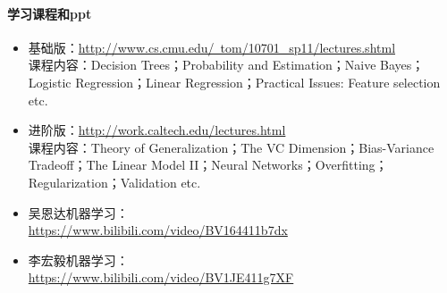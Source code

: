 \documentclass[lang=cn,11pt,a4paper]{eleganttemplate}
\begin{document}
\paragraph{学习课程和ppt}
\begin{itemize}
    \item 基础版：\href{http://www.cs.cmu.edu/~tom/10701_sp11/lectures.shtml}{http://www.cs.cmu.edu/~tom/10701\_sp11/lectures.shtml} \\
课程内容：Decision Trees；Probability and Estimation；Naive Bayes；Logistic Regression；Linear Regression；Practical Issues: Feature selection etc.
    \item 进阶版：\href{http://work.caltech.edu/lectures.html}{http://work.caltech.edu/lectures.html} \\
课程内容：Theory of Generalization；The VC Dimension；Bias-Variance Tradeoff；The Linear Model II；Neural Networks；Overfitting；Regularization；Validation etc.
    \item 吴恩达机器学习：\\ \href{https://www.bilibili.com/video/BV164411b7dx}{https://www.bilibili.com/video/BV164411b7dx}
    \item 李宏毅机器学习：\\
    \href{https://www.bilibili.com/video/BV1JE411g7XF}{https://www.bilibili.com/video/BV1JE411g7XF}
\end{itemize}
\end{document}
